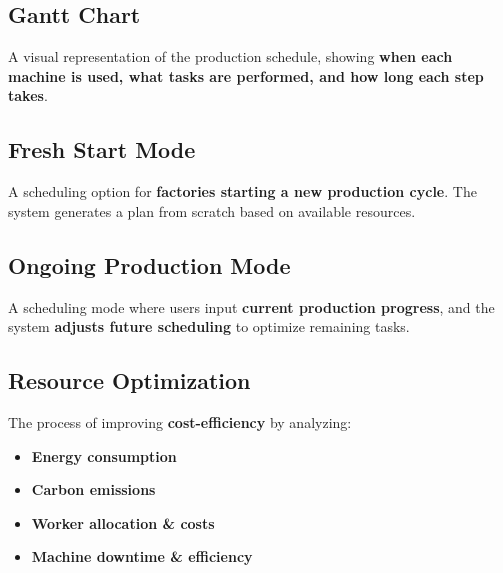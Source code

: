 \subsection{Gantt Chart}
A visual representation of the production schedule, showing \textbf{when each machine is used, what tasks are performed, and how long each step takes}.

\subsection{Fresh Start Mode}
A scheduling option for \textbf{factories starting a new production cycle}. The system generates a plan from scratch based on available resources.

\subsection{Ongoing Production Mode}
A scheduling mode where users input \textbf{current production progress}, and the system \textbf{adjusts future scheduling} to optimize remaining tasks.

\subsection{Resource Optimization}
The process of improving \textbf{cost-efficiency} by analyzing:  
\begin{itemize}
    \item \textbf{Energy consumption}
    \item \textbf{Carbon emissions}
    \item \textbf{Worker allocation \& costs}
    \item \textbf{Machine downtime \& efficiency}
\end{itemize}